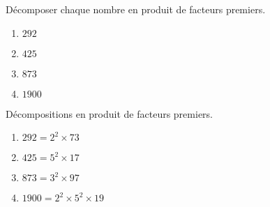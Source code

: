 \begin{exercice*}
    \label{N2exosBase014}
    Décomposer chaque nombre en produit de facteurs premiers.
    \begin{enumerate}
        \item $292$
        \item $425$
        \item $873$
        \item $\num{1900}$
    \end{enumerate}

\end{exercice*}
\begin{corrige}
    Décompositions en produit de facteurs premiers.
    
    \begin{enumerate}
        \item $292=2^2\times 73$
        \item $425=5^2\times 17$
        \item $873=3^2\times 97$
        \item $\num{1900}=2^2\times 5^2 \times 19$
    \end{enumerate}

\end{corrige}

